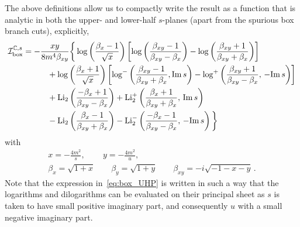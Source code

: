 \documentclass[12pt]{article}
\numberwithin{figure}{section}
\def \nn {\nonumber}
\def \C {\mathbb{C}}
\def \I {\mathcal{I}}
\def \Im {\mathrm{Im}}
\def \Li {\mathrm{Li}}
\begin{document}
   
	The above definitions allow us to compactly write the result as a function that is analytic in both the upper- and lower-half $s$-planes (apart from the spurious box branch cuts), explicitly,
    \begin{align} \label{eq:box_UHP}
        \I_{\text{box}}^{\C,s} 
        & =
        -
        \frac{x y}{8 m^4 \beta_{xy}}
        \bigg\{
            \log \left(\frac{\beta_x-1}{\sqrt{x}} \right)
            \left[ \log\left( \frac{\beta_{xy}-1}{\beta_{xy}-\beta_x} \right)
            -
            \log \left( \frac{\beta_{xy}+1}{\beta_{xy}+\beta_x}\right)
            \right]
            \\
            &  \hspace{1.05cm} +
            \log \left(\frac{\beta_x+1}{\sqrt{x}}\right)
            \left[
            \log^{-} \left( \frac{\beta_{xy}-1}{\beta_{xy}+\beta_x}, \Im\, s \right)
            -
            \log^{+}\left( \frac{\beta_{xy}+1}{\beta_{xy}-\beta_x} , \, - \Im\, s  \right)
            \right]
            \nn\\ 
            & \hspace{1.05 cm}
            +
            \Li_2 \left( \frac{-\beta_x+1}{\beta_{xy}-\beta_x} \right)
            +
            \Li_2^{+} \left( \frac{\beta_x+1}{\beta_{xy}+\beta_x}, \, \Im\, s \right)
            \nn\\ 
            & \hspace{1.05 cm}
            -
            \Li_2 \left( \frac{\beta_x-1}{\beta_{xy}+\beta_x} \right)
            -
            \Li_2^{-} \left( \frac{-\beta_x-1}{\beta_{xy}-\beta_x} ,\,- \Im\, s \right)
        \bigg\}\nn
    \end{align}
    with
    \begin{gather}
        x = -\frac{4 m^2}{s}, \, \qquad
        y = -\frac{4 m^2}{u}, \\ 
        \beta_x = \sqrt{1+x}
        \qquad 
        \beta_y = \sqrt{1+y}
        \qquad 
        \beta_{xy} = - i \sqrt{-1-x-y} \,.
    \end{gather}
	Note that the expression in~\eqref{eq:box_UHP} is written in such a way that the logarithms and dilogarithms can be evaluated on their principal sheet as $s$ is taken to have small positive imaginary part, and consequently $u$ with a small negative imaginary part.
	
\end{document}
